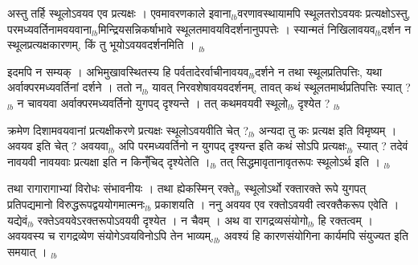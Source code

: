 \documentclass[article,12pt,a4paper]{memoir}%
\newcounter{parCount}
\begin{document}
	  \pstart \leavevmode%
	अस्तु तर्हि स्थूलोऽवयव एव प्रत्यक्षः । एवमावरणकाले इवाना{\tiny $_{lb}$}वरणावस्थायामपि स्थूलतरोऽवयवः प्रत्यक्षोऽस्तु, परमध्यवर्तिनामवयवाना{\tiny $_{lb}$}मिन्द्रियसन्निकर्षाभावे स्थूलतमावयविदर्शनानुपपत्तेः । स्यान्मतं निखिलावयव{\tiny $_{lb}$}दर्शन न स्थूलप्रत्यक्षकारणम्, किं तु भूयोऽवयवदर्शनमिति ।
	{}
	\pend%
      {\tiny $_{lb}$}

	  \pstart \leavevmode%
	इदमपि न सम्यक् । अभिमुखावस्थितस्य हि पर्वतादेरर्वाचीनावयव{\tiny $_{lb}$}दर्शने न तथा स्थूलप्रतिपत्तिः, यथा अर्वाक्परमध्यवर्तिनां दर्शने । ततो न{\tiny $_{lb}$} यावत् निरवशेषावयवदर्शनम्, तावत् कथं स्थूलतमार्थप्रतिपत्तिः स्यात् ?{\tiny $_{lb}$} न चावयवा अर्वाक्परमध्यवर्तिनो युगपद् दृश्यन्ते । तत् कथमवयवी स्थूलो{\tiny $_{lb}$} दृश्येत ?
	{}
	\pend%
      {\tiny $_{lb}$}

	  \pstart \leavevmode%
	क्रमेण दिशामवयवानां प्रत्यक्षीकरणे प्रत्यक्षः स्थूलोऽवयवीति चेत् ?{\tiny $_{lb}$} अन्यदा तु कः प्रत्यक्ष इति विमृष्यम् । अवयव इति चेत् ? अवयवा{\tiny $_{lb}$}  \leavevmode{} अपि परमध्यवर्तिनो न युगपद् दृश्यन्त इति कथं सोऽपि प्रत्यक्षः{\tiny $_{lb}$} स्यात् ? तदेवं नावयवी नावयवाः प्रत्यक्षा इति न किन्ँचिद् दृश्येतेति ।{\tiny $_{lb}$} तत् \leavevmode{} सिद्धमावृतानावृतरूपः स्थूलोऽर्थ इति ।
	{}
	\pend%
      {\tiny $_{lb}$}

	  \pstart \leavevmode%
	तथा रागारागाभ्यां विरोधः संभावनीयः । तथा ह्येकस्मिन् रक्ते{\tiny $_{lb}$} स्थूलोऽर्थो रक्तारक्ते रूपे युगपत् प्रतिपद्यमानो विरुद्धरूपद्वययोगमात्मनः{\tiny $_{lb}$} प्रकाशयति । ननु अवयव एव रक्तोऽवयवी त्वरक्तैकरूप एवेति । यद्येवं{\tiny $_{lb}$} रक्तेऽवयवेऽरक्तरूपोऽवयवी दृश्येत । न चैवम् । अथ वा रागद्रव्यसंयोगो{\tiny $_{lb}$} हि रक्तत्वम् । अवयवस्य च रागद्रव्येण संयोगेऽवयविनोऽपि तेन भाव्यम्,{\tiny $_{lb}$} अवश्यं हि कारणसंयोगिना कार्यमपि संयुज्यत इति समयात् ।
	{}
	\pend%
      {\tiny $_{lb}$}
\end{document}
